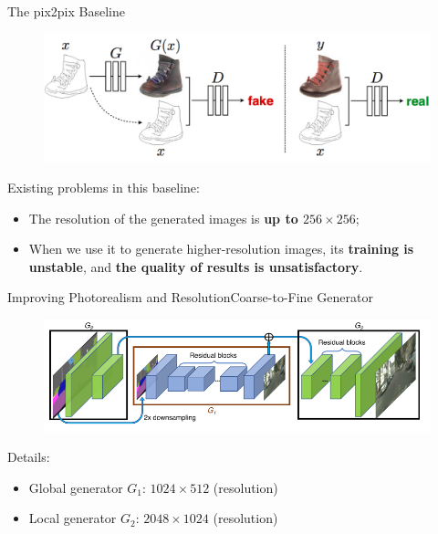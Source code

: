 \documentclass{beamer}
\begin{document}
\begin{frame}{The pix2pix Baseline }
\begin{figure}
	\centering
	\includegraphics[height=0.4\textheight]{images/baseline}
\end{figure}
%
%
\begin{beamerboxesrounded}[upper=uppercol,lower=lowercol,shadow=false]{Existing problems in this baseline:}
\begin{itemize}
	\item
	The resolution of the generated images is \textbf{up to $256\times256$};
	\item 
	When we use it to generate higher-resolution images, its \textbf{training is unstable}, and \textbf{the quality of results is unsatisfactory}.
\end{itemize}
\end{beamerboxesrounded}
\end{frame}

\begin{frame}{Improving Photorealism and Resolution}{Coarse-to-Fine Generator}
	\begin{figure}
	\centering
	\includegraphics[height=0.4\textheight]{images/structure}
\end{figure}
%
%
\begin{beamerboxesrounded}[upper=uppercol,lower=lowercol,shadow=false]{Details:}
\begin{itemize}
	\item
	Global generator $G_1$: $1024\times512$ (resolution)
	\item
	Local generator $G_2$: $2048\times1024$ (resolution)
\end{itemize}
\end{beamerboxesrounded}
\end{frame}
\end{document}

